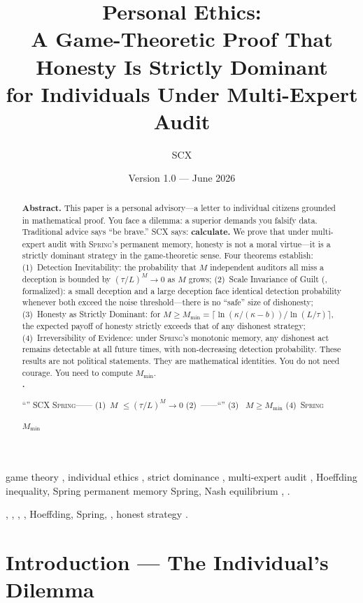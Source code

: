 \documentclass[11pt,a4paper]{article}
\title{\textbf{\SCX{} Personal Ethics:}\\[4pt]
\large A Game-Theoretic Proof That Honesty Is Strictly Dominant\\
for Individuals Under Multi-Expert Audit\\[4pt]
\small }
\author{SCX}
\date{Version 1.0 --- June 2026}
\theoremstyle{definition}
\theoremstyle{remark}
\newcommand{\SCX}{\textsc{SCX}}
\newcommand{\Spring}{\textsc{Spring}}
\newcommand{\threshold}{\tau}
\newcommand{\tol}{L}
\newcommand{\benefit}{b}
\newcommand{\cost}{\kappa}
\begin{document}
\maketitle

\begin{abstract}
\noindent
{\bf Abstract.}
This paper is a personal advisory---a letter to individual citizens grounded in mathematical proof.
You face a dilemma: a superior demands you falsify data. Traditional advice says ``be brave.''
\SCX{} says: \textbf{calculate.}
We prove that under multi-expert audit with \Spring{}'s permanent memory, honesty is not a moral virtue---it is a strictly dominant strategy in the game-theoretic sense.
Four theorems establish:
(1)~Detection Inevitability: the probability that $M$ independent auditors all miss a deception is bounded by $(\threshold/\tol)^M \to 0$ as $M$ grows;
(2)~Scale Invariance of Guilt (, formalized): a small deception and a large deception face identical detection probability whenever both exceed the noise threshold---there is no ``safe'' size of dishonesty;
(3)~Honesty as Strictly Dominant: for $M \geq M_{\min} = \lceil \ln(\cost/(\cost-\benefit)) / \ln(\tol/\threshold) \rceil$, the expected payoff of honesty strictly exceeds that of any dishonest strategy;
(4)~Irreversibility of Evidence: under \Spring{}'s monotonic memory, any dishonest act remains detectable at all future times, with non-decreasing detection probability.
These results are not political statements. They are mathematical identities.
You do not need courage. You need to compute $M_{\min}$.
\\[6pt]
{\bf .}

“”
\SCX{}{\bf }
\Spring{}——
(1)~$M$ $\leq (\threshold/\tol)^M \to 0$
(2)~——“”
(3)~ $M \geq M_{\min}$ 
(4)~\Spring{}

 $M_{\min}$
\end{abstract}

\medskip
{} game theory , individual ethics ,
strict dominance , multi-expert audit ,
Hoeffding inequality, Spring permanent memory Spring,
Nash equilibrium , .

\vspace{6pt}
\noindent{\small\bfseries :} , , , , Hoeffding,
Spring, , honest strategy .

\section{Introduction --- The Individual's Dilemma}
\label{sec:intro}
\end{document}
